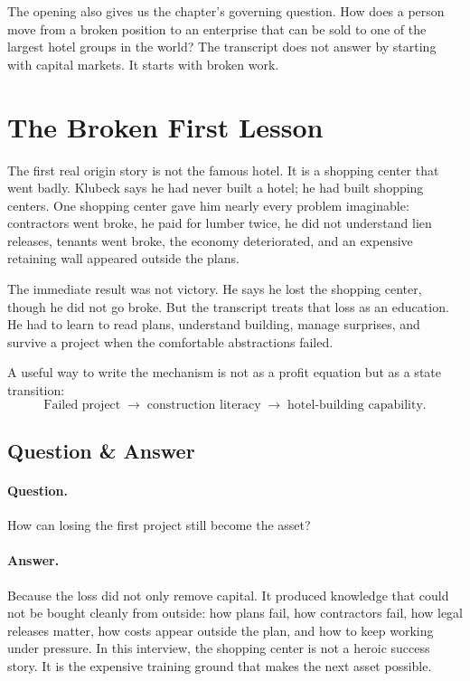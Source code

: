 The opening also gives us the chapter's governing question. How does a person move from a broken position to an enterprise that can be sold to one of the largest hotel groups in the world? The transcript does not answer by starting with capital markets. It starts with broken work.

\section{The Broken First Lesson}

The first real origin story is not the famous hotel. It is a shopping center that went badly. Klubeck says he had never built a hotel; he had built shopping centers. One shopping center gave him nearly every problem imaginable: contractors went broke, he paid for lumber twice, he did not understand lien releases, tenants went broke, the economy deteriorated, and an expensive retaining wall appeared outside the plans.

The immediate result was not victory. He says he lost the shopping center, though he did not go broke. But the transcript treats that loss as an education. He had to learn to read plans, understand building, manage surprises, and survive a project when the comfortable abstractions failed.

A useful way to write the mechanism is not as a profit equation but as a state transition:
\begin{equation}
\text{Failed project}
\;\longrightarrow\;
\text{construction literacy}
\;\longrightarrow\;
\text{hotel-building capability}.
\end{equation}

\subsection{Question \& Answer}

\paragraph{Question.}
How can losing the first project still become the asset?

\paragraph{Answer.}
Because the loss did not only remove capital. It produced knowledge that could not be bought cleanly from outside: how plans fail, how contractors fail, how legal releases matter, how costs appear outside the plan, and how to keep working under pressure. In this interview, the shopping center is not a heroic success story. It is the expensive training ground that makes the next asset possible.


